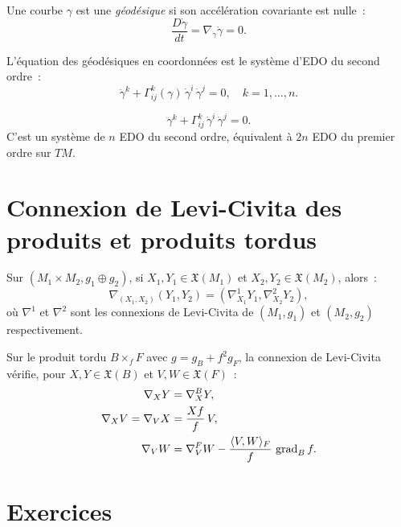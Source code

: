 \begin{definition}
Une courbe $\gamma$ est une \emph{g\'eod\'esique} si son acc\'el\'eration covariante
est nulle~:
\[
    \frac{D\dot\gamma}{dt} = \nabla_{\dot\gamma}\dot\gamma = 0.
\]
\end{definition}

L'\'equation des g\'eod\'esiques en coordonn\'ees est le syst\`eme d'EDO du second ordre~:
\[
    \ddot\gamma^k + \Gamma^k_{ij}(\gamma)\, \dot\gamma^i\, \dot\gamma^j = 0,
    \quad k = 1, \ldots, n.
\]

\begin{formules}[title=\textbf{\'Equation des g\'eod\'esiques}]
\[
    \ddot\gamma^k + \Gamma^k_{ij}\, \dot\gamma^i\, \dot\gamma^j = 0.
\]
C'est un syst\`eme de $n$ EDO du second ordre, \'equivalent \`a $2n$ EDO du premier
ordre sur $TM$.
\end{formules}

\section{Connexion de Levi-Civita des produits et produits tordus}

\begin{proposition}
Sur $(M_1 \times M_2, g_1 \oplus g_2)$, si $X_1, Y_1 \in \mathfrak{X}(M_1)$ et
$X_2, Y_2 \in \mathfrak{X}(M_2)$, alors~:
\[
    \nabla_{(X_1, X_2)}(Y_1, Y_2) = (\nabla^1_{X_1} Y_1, \nabla^2_{X_2} Y_2),
\]
o\`u $\nabla^1$ et $\nabla^2$ sont les connexions de Levi-Civita de $(M_1, g_1)$
et $(M_2, g_2)$ respectivement.
\end{proposition}

\begin{proposition}
\label{prop:warped_LC}
Sur le produit tordu $B \times_f F$ avec $g = g_B + f^2 g_F$, la connexion de
Levi-Civita v\'erifie, pour $X, Y \in \mathfrak{X}(B)$ et $V, W \in \mathfrak{X}(F)$~:
\begin{align*}
    \nabla_X Y &= \nabla^B_X Y, \\
    \nabla_X V = \nabla_V X &= \frac{Xf}{f}\, V, \\
    \nabla_V W &= \nabla^F_V W - \frac{\langle V, W \rangle_F}{f}\, \operatorname{grad}_B f.
\end{align*}
\end{proposition}

\section{Exercices}

